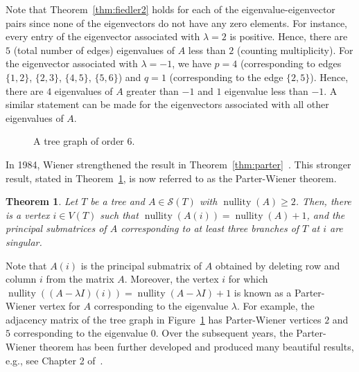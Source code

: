 \documentclass{article}
\newtheorem{theorem}{Theorem}[section]
\theoremstyle{definition}
\newcommand\nullity[1]{\operatorname{nullity}\left(#1\right)}
\begin{document}
Note that Theorem~\ref{thm:fiedler2} holds for each of the eigenvalue-eigenvector pairs since none of the eigenvectors do not have any zero elements. 
For instance, every entry of the eigenvector associated with $\lambda = 2$ is positive. 
Hence, there are $5$ (total number of edges) eigenvalues of $A$ less than $2$ (counting multiplicity). 
For the eigenvector associated with $\lambda = -1$, we have $p=4$ (corresponding to edges $\{1,2\}$, $\{2,3\}$, $\{4,5\}$, $\{5,6\}$) and $q=1$ (corresponding to the edge $\{2,5\}$).
Hence, there are $4$ eigenvalues of $A$ greater than $-1$ and $1$ eigenvalue less than $-1$. 
A similar statement can be made for the eigenvectors associated with all other eigenvalues of $A$.
\begin{figure}[ht]
\centering
{}
\caption{A tree graph of order $6$.}
\label{fig:tree-graph}
\end{figure}

In 1984, Wiener strengthened the result in Theorem~\ref{thm:parter}~\cite{Wiener1984}.
This stronger result, stated in Theorem~\ref{thm:parter-wiener}, is now referred to as the Parter-Wiener theorem.
\begin{theorem}\label{thm:parter-wiener}
Let $T$ be a tree and $A\in\mathcal{S}(T)$ with $\nullity{A}\geq 2$. 
Then, there is a vertex $i\in V(T)$ such that $\nullity{A(i)} = \nullity{A} + 1$, and the principal submatrices of $A$ corresponding to at least three branches of $T$ at $i$ are singular.
\end{theorem}

Note that $A(i)$ is the principal submatrix of $A$ obtained by deleting row and column $i$ from the matrix $A$. 
Moreover, the vertex $i$ for which $\nullity{(A-\lambda I)(i)} = \nullity{A-\lambda I}+1$ is known as a Parter-Wiener vertex for $A$ corresponding to the eigenvalue $\lambda$.
For example, the adjacency matrix of the tree graph in Figure~\ref{fig:tree-graph} has Parter-Wiener vertices $2$ and $5$ corresponding to the eigenvalue $0$.
Over the subsequent years, the Parter-Wiener theorem has been further developed and produced many beautiful results, e.g., see Chapter 2 of~\cite{Johnson2018}.
\end{document}
